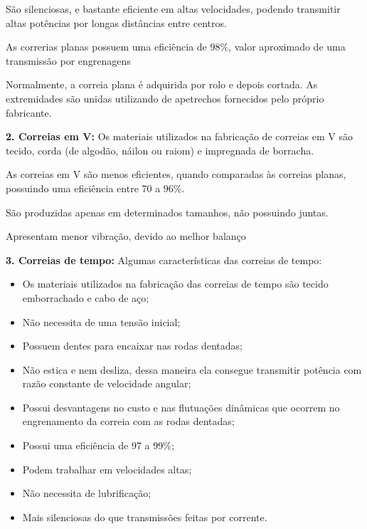 \par São silenciosas, e bastante eficiente em altas velocidades, podendo transmitir altas potências por longas distâncias entre centros.

\par As correrias planas possuem uma eficiência de 98\%, valor aproximado de uma transmissão por engrenagens

\par Normalmente, a correia plana é adquirida por rolo e depois cortada. As extremidades são unidas utilizando de apetrechos fornecidos pelo próprio fabricante.

\textbf{2. Correias em V:}
Os materiais utilizados na fabricação de correias em V são tecido, corda (de algodão, náilon ou raiom) e impregnada de borracha.
    
\par As correias em V são menos eficientes, quando comparadas às correias planas, possuindo uma eficiência entre 70 a 96\%.

\par São produzidas apenas em determinados tamanhos, não possuindo juntas.

\par Apresentam menor vibração, devido ao melhor balanço

\textbf{3. Correias de tempo:}
Algumas características das correias de tempo:

\begin{itemize}
\item Os materiais utilizados na fabricação das correias de tempo são tecido emborrachado e cabo de aço;
\item Não necessita de uma tensão inicial;
\item Possuem dentes para encaixar nas rodas dentadas;
\item Não estica e nem desliza, dessa maneira ela consegue transmitir potência com razão constante de velocidade angular;
\item Possui desvantagens no custo e nas flutuações dinâmicas que ocorrem no engrenamento da correia com as rodas dentadas;
\item Possui uma eficiência de 97 a 99\%;
\item Podem trabalhar em velocidades altas;
\item Não necessita de lubrificação;
\item Mais silenciosas do que transmissões feitas por corrente.
\end{itemize}


